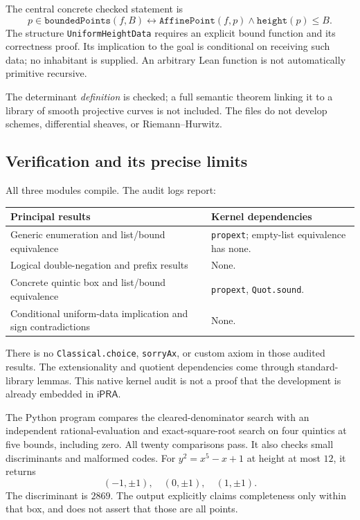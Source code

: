 \documentclass[11pt,letterpaper]{article}
\newcommand{\iPRA}{\mathsf{iPRA}}
\theoremstyle{definition}
\begin{document}
The central concrete checked statement is
\[
 p\in\mathtt{boundedPoints}(f,B)
 \leftrightarrow
 \mathtt{AffinePoint}(f,p)\wedge\mathtt{height}(p)\leq B.
\]
The structure \texttt{UniformHeightData} requires an explicit bound
function and its correctness proof. Its implication to the goal is
conditional on receiving such data; no inhabitant is supplied.
An arbitrary Lean function is not automatically primitive recursive.

The determinant \emph{definition} is checked; a full semantic theorem
linking it to a library of smooth projective curves is not included.
The files do not develop schemes, differential sheaves, or
Riemann--Hurwitz.

\subsection{Verification and its precise limits}
All three modules compile. The audit logs report:
\begin{center}
\begin{tabularx}{\textwidth}{@{}p{}X@{}}
\toprule
Principal results & Kernel dependencies\\ \midrule
Generic enumeration and list/bound equivalence &
\texttt{propext}; empty-list equivalence has none.\\
Logical double-negation and prefix results & None.\\
Concrete quintic box and list/bound equivalence &
\texttt{propext}, \texttt{Quot.sound}.\\
Conditional uniform-data implication and sign contradictions & None.\\
\bottomrule
\end{tabularx}
\end{center}
There is no \texttt{Classical.choice}, \texttt{sorryAx}, or custom axiom
in those audited results. The extensionality and quotient dependencies
come through standard-library lemmas. This native kernel audit is not
a proof that the development is already embedded in $\iPRA$.

The Python program compares the cleared-denominator search with an
independent rational-evaluation and exact-square-root search on four
quintics at five bounds, including zero. All twenty comparisons pass.
It also checks small discriminants and malformed codes.
For $y^2=x^5-x+1$ at height at most $12$, it returns
\[
                  (-1,\pm1),\quad(0,\pm1),\quad(1,\pm1).
\]
The discriminant is $2869$. The output explicitly claims completeness
only within that box, and does not assert that those are all points.
\end{document}
